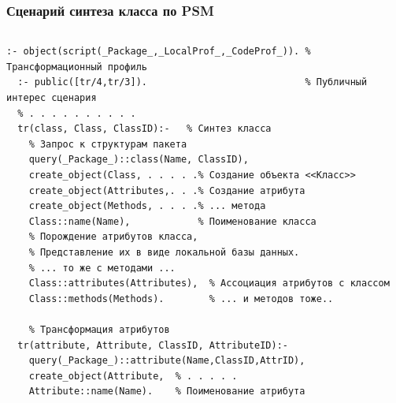 \documentclass[10pt]{beamer}
\begin{document}
\begin{frame}[fragile]
  \frametitle{Сценарий синтеза класса по PSM}

  \begin{columns}
    \begin{column}{0.6\textwidth}
\begin{verbatim}
:- object(script(_Package_,_LocalProf_,_CodeProf_)). % Трансформационный профиль
  :- public([tr/4,tr/3]).                            % Публичный интерес сценария
  % . . . . . . . . . .
  tr(class, Class, ClassID):-   % Синтез класса
    % Запрос к структурам пакета
    query(_Package_)::class(Name, ClassID),
    create_object(Class, . . . . .% Создание объекта <<Класс>>
    create_object(Attributes,. . .% Создание атрибута
    create_object(Methods, . . . .% ... метода
    Class::name(Name),            % Поименование класса
    % Порождение атрибутов класса,
    % Представление их в виде локальной базы данных.
    % ... то же с методами ...
    Class::attributes(Attributes),  % Ассоциация атрибутов с классом
    Class::methods(Methods).        % ... и методов тоже..

    % Трансформация атрибутов
  tr(attribute, Attribute, ClassID, AttributeID):-
    query(_Package_)::attribute(Name,ClassID,AttrID),
    create_object(Attribute,  % . . . . .
    Attribute::name(Name).    % Поименование атрибута


\end{verbatim}
\end{column}
\end{columns}
\end{frame}
\end{document}

